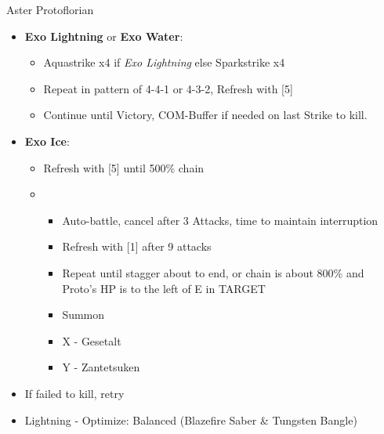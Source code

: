 \begin{battle}{Aster Protoflorian}
\begin{multicols}{2}
\begin{itemize}
      \item \textbf{Exo Lightning} or \textbf{Exo Water}:
        \begin{itemize}
            \item Aquastrike x4 if \textit{Exo Lightning} else Sparkstrike x4
            \item Repeat in pattern of 4-4-1 or 4-3-2, Refresh with [5]
            \item Continue until Victory, COM-Buffer if needed on last Strike to kill.
        \end{itemize}
        \item \textbf{Exo Ice}:
        \begin{itemize}
            \item Refresh with [5] until 500\% chain
            \item \sixth
            \begin{itemize}
                \item Auto-battle, cancel after 3 Attacks, time to maintain interruption
                \item Refresh with [1] after 9 attacks
                \item Repeat until stagger about to end, or chain is about 800\% and Proto's HP is to the left of E in TARGET
                \item Summon
                \item X - Gesetalt
                \item Y - Zantetsuken
            \end{itemize}
    \end{itemize}
    \item If failed to kill, retry
\end{itemize}
\end{multicols}
\end{battle}
\begin{multicols}{2}
\begin{menu}
    \begin{itemize}
        \equip
        \begin{itemize}
            \item Lightning - Optimize: Balanced (Blazefire Saber \& Tungsten Bangle)
        \end{itemize}
    \end{itemize}
\end{menu}



\end{multicols}